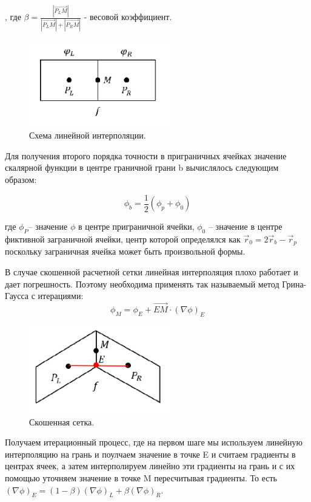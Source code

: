 , где $\beta = \frac{|\vec{P_LM}|}{|\vec{P_LM}|+|\vec{P_RM}|}$ - весовой коэффициент.

\begin{figure}[H]
    \centering
    \includegraphics[width=0.55\textwidth]{img/5.png}
    \caption{Схема линейной интерполяции.}
    \label{fig:5}
\end{figure}

Для получения второго порядка точности в приграничных ячейках значение
скалярной функции в центре граничной грани b вычислялось следующим образом:

$$\phi_b = \frac{1}{2}(\phi_p+\phi_0)$$

где $\phi_P$– значение $\phi$ в центре приграничной ячейки, $\phi_0$ – значение в центре фиктивной заграничной ячейки, центр которой определялся как 
$\vec{r}_0 =  2\vec{r}_b - \vec{r}_p$ поскольку заграничная
ячейка может быть произвольной формы.

В случае скошенной расчетной сетки линейная интерполяция плохо работает и дает погрешность. Поэтому необходима применять так называемый метод Грина-Гаусса с итерациями:
\begin{equation}
    \phi_M = \phi_E + \vec{EM}\cdot(\nabla\phi)_E
\end{equation}

\begin{figure}[H]
    \centering
    \includegraphics[width=0.55\textwidth]{img/6.png}
    \caption{Скошенная сетка.}
    \label{fig:6}
\end{figure}

Получаем итерационный процесс, где на первом шаге мы используем линейную интерполяцию на грань и поулчаем значение в точке E и считаем градиенты в центрах ячеек, а затем интерполируем линейно эти градиенты на грань и с их помощью уточняем значение в точке M пересчитывая градиенты. То есть $(\nabla\phi)_E = (1-\beta)(\nabla\phi)_L+\beta(\nabla\phi)_R.$

